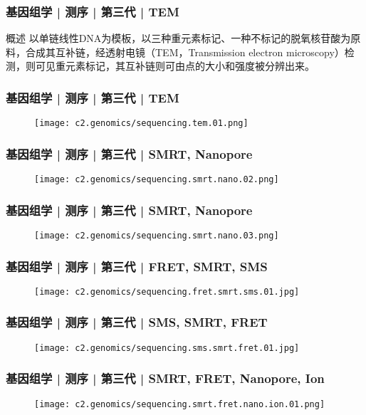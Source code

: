 \begin{frame}
  \frametitle{基因组学 | 测序 | 第三代 | TEM}
  \begin{block}{概述}
以单链线性DNA为模板，以三种重元素标记、一种不标记的脱氧核苷酸为原料，合成其互补链，经透射电镜（TEM，Transmission electron microscopy）检测，则可见重元素标记，其互补链则可由点的大小和强度被分辨出来。
  \end{block}
\end{frame}

\begin{frame}
  \frametitle{基因组学 | 测序 | 第三代 | TEM}
  \begin{figure}
    \centering
    \texttt{[image: c2.genomics/sequencing.tem.01.png]}
  \end{figure}
\end{frame}

\begin{frame}
  \frametitle{基因组学 | 测序 | 第三代 | SMRT, Nanopore}
  \begin{figure}
    \centering
    \texttt{[image: c2.genomics/sequencing.smrt.nano.02.png]}
  \end{figure}
\end{frame}

\begin{frame}
  \frametitle{基因组学 | 测序 | 第三代 | SMRT, Nanopore}
  \begin{figure}
    \centering
    \texttt{[image: c2.genomics/sequencing.smrt.nano.03.png]}
  \end{figure}
\end{frame}

\begin{frame}
  \frametitle{基因组学 | 测序 | 第三代 | FRET, SMRT, SMS}
  \begin{figure}
    \centering
    \texttt{[image: c2.genomics/sequencing.fret.smrt.sms.01.jpg]}
  \end{figure}
\end{frame}

\begin{frame}
  \frametitle{基因组学 | 测序 | 第三代 | SMS, SMRT, FRET}
  \begin{figure}
    \centering
    \texttt{[image: c2.genomics/sequencing.sms.smrt.fret.01.jpg]}
  \end{figure}
\end{frame}

\begin{frame}
  \frametitle{基因组学 | 测序 | 第三代 | SMRT, FRET, Nanopore, Ion}
  \begin{figure}
    \centering
    \texttt{[image: c2.genomics/sequencing.smrt.fret.nano.ion.01.png]}
  \end{figure}
\end{frame}

